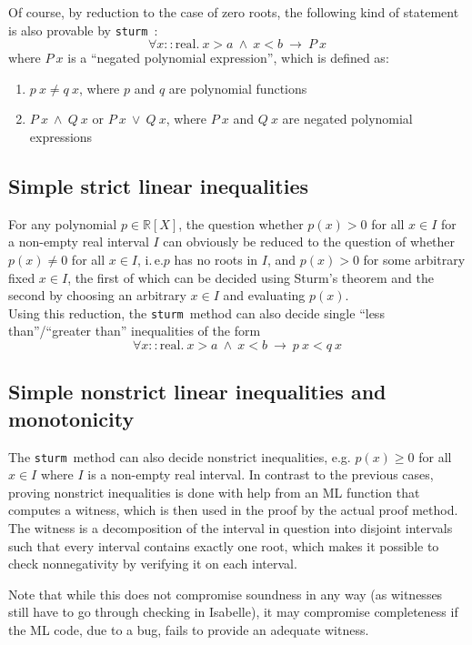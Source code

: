 \documentclass[11pt,a4paper,oneside]{article}
\newcommand{\ie}{i.\,e.}
\newcommand{\RR}{\mathbb{R}}
\newcommand{\sturm}{\texttt{sturm}}
\newcommand{\real}{\textrm{real}}
\begin{document}
Of course, by reduction to the case of zero roots, the following kind of statement is also provable by \sturm\ :
$$\forall x::\real.\ x > a\ \wedge\ x < b\ \longrightarrow\ P\ x$$
where $P\ x$ is a \enquote{negated polynomial expression}, which is defined as:
\begin{enumerate}
\item $p\ x\neq q\ x$, where $p$ and $q$ are polynomial functions
\item $P\ x\ \wedge\ Q\ x$ or $P\ x\ \vee\ Q\ x$, where $P\ x$ and $Q\ x$ are negated polynomial expressions
\end{enumerate}

\subsection{Simple strict linear inequalities}
For any polynomial $p\in\RR[X]$, the question whether $p(x) > 0$ for all $x\in I$ for a non-empty real interval $I$ can obviously be reduced to the question of whether $p(x) \neq 0$ for all $x\in I$, \ie $p$ has no roots in $I$, and $p(x) > 0$ for some arbitrary fixed $x\in I$, the first of which can be decided using Sturm's theorem and the second by choosing an arbitrary $x\in I$ and evaluating $p(x)$.\\

Using this reduction, the \sturm\ method can also decide single \enquote{less than}/\enquote{greater than} inequalities of the form 
$$\forall x::\real.\ x > a\ \wedge\ x < b\ \longrightarrow\ p\ x < q\ x$$

\subsection{Simple nonstrict linear inequalities and monotonicity}

The \sturm\ method can also decide nonstrict inequalities, e.g. $p(x) \geq 0$ for all $x\in I$ where $I$ is a non-empty real interval. In contrast to the previous cases, proving nonstrict inequalities is done with help from an ML function that computes a witness, which is then used in the proof by the actual proof method. The witness is a decomposition of the interval in question into disjoint intervals such that every interval contains exactly one root, which makes it possible to check nonnegativity by verifying it on each interval.

Note that while this does not compromise soundness in any way (as witnesses still have to go through checking in Isabelle), it may compromise completeness if the ML code, due to a bug, fails to provide an adequate witness.\newpage
\end{document}
